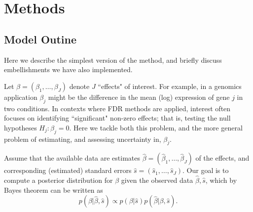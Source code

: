 \documentclass[11pt]{article}
\def\lfdr{\textit{lfdr}}
\def\bhat{\hat{\beta}}
\def\shat{\hat{s}}
\begin{document}
\def\df{df}
\def\FDR{\text{FDR}}
\def\fdr{\text{\lfdr}}
\def\FSR{\text{FSR}}
\def\fsr{\text{lfsr}}

 \section*{Methods}

 \subsection*{Model Outine}
 
Here we describe the simplest version of the method, and briefly discuss embellishments we have also implemented.

Let $\beta=(\beta_1,\dots,\beta_J)$ denote $J$ ``effects" of interest. For example, in a genomics application 
$\beta_j$ might be the difference in the mean (log) expression of gene $j$ in two conditions.
In contexts where FDR methods are applied, interest often focuses on identifying ``significant" non-zero effects;
that is, testing the null hypotheses $H_j:\beta_j=0$.  Here we tackle both this problem, and the  
more general problem of estimating, and assessing uncertainty in, $\beta_j$.
 
Assume that the available data are estimates $\bhat=(\bhat_1,\dots,\bhat_J)$ of the effects,
and corresponding (estimated) standard errors $\shat=(\shat_1,\dots,\shat_J)$.  Our goal is to compute a posterior distribution for $\beta$ given the observed data $\bhat,\shat$,
which by Bayes theorem can be written as 
\begin{equation}
p(\beta | \bhat, \shat) \propto p(\beta | \shat) p(\bhat | \beta, \shat).
\end{equation}
\end{document}
